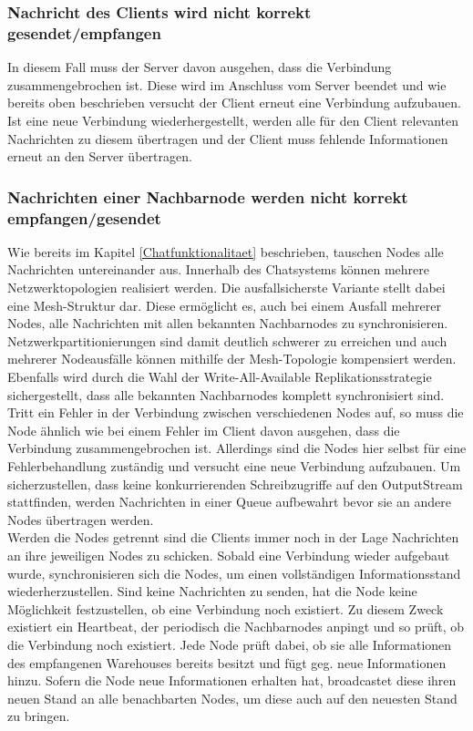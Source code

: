 \subsubsection*{Nachricht des Clients wird nicht korrekt gesendet/empfangen}
In diesem Fall muss der Server davon ausgehen, dass die Verbindung zusammengebrochen ist. Diese wird im Anschluss vom Server beendet
und wie bereits oben beschrieben versucht der Client erneut eine Verbindung aufzubauen.
Ist eine neue Verbindung wiederhergestellt, werden alle für den Client relevanten Nachrichten zu diesem übertragen 
und der Client muss fehlende Informationen erneut an den Server übertragen.

\subsubsection*{Nachrichten einer Nachbarnode werden nicht korrekt empfangen/gesendet}
Wie bereits im Kapitel \ref{Chatfunktionalitaet} beschrieben, tauschen Nodes alle Nachrichten untereinander aus. Innerhalb des Chatsystems können mehrere
Netzwerktopologien realisiert werden. Die ausfallsicherste Variante stellt dabei eine Mesh-Struktur dar. 
Diese ermöglicht es, auch bei einem Ausfall mehrerer Nodes, alle Nachrichten mit allen bekannten Nachbarnodes zu synchronisieren. Netzwerkpartitionierungen sind damit
deutlich schwerer zu erreichen und auch mehrerer Nodeausfälle können mithilfe der Mesh-Topologie kompensiert werden. Ebenfalls wird durch die Wahl der
Write-All-Available Replikationsstrategie sichergestellt, dass alle bekannten Nachbarnodes komplett synchronisiert sind.
\\
Tritt ein Fehler in der Verbindung zwischen verschiedenen Nodes auf, so muss die Node ähnlich wie bei einem Fehler im Client davon ausgehen, 
dass die Verbindung zusammengebrochen ist. Allerdings sind die Nodes hier selbst für eine Fehlerbehandlung zuständig und versucht eine neue
Verbindung aufzubauen. Um sicherzustellen, dass keine konkurrierenden Schreibzugriffe auf den OutputStream stattfinden,
werden Nachrichten in einer Queue aufbewahrt bevor sie an andere Nodes übertragen werden.
\\
Werden die Nodes getrennt sind die Clients immer noch in der Lage Nachrichten an ihre jeweiligen Nodes zu schicken.
Sobald eine Verbindung wieder aufgebaut wurde, synchronisieren sich die Nodes, um einen vollständigen Informationsstand wiederherzustellen.
Sind keine Nachrichten zu senden, hat die Node keine Möglichkeit festzustellen, ob eine Verbindung noch existiert. 
Zu diesem Zweck existiert ein Heartbeat, der periodisch die Nachbarnodes anpingt und so prüft, ob die Verbindung noch existiert.
Jede Node prüft dabei, 
ob sie alle Informationen des empfangenen Warehouses bereits besitzt und fügt geg. neue Informationen hinzu. 
Sofern die Node neue Informationen erhalten hat, broadcastet diese ihren neuen Stand an alle benachbarten Nodes,
um diese auch auf den neuesten Stand zu bringen.



